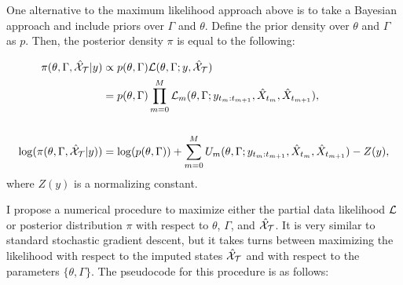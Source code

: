 One alternative to the maximum likelihood approach above is to take a Bayesian approach and include priors over $\Gamma$ and $\theta$. Define the prior density over $\theta$ and $\Gamma$ as $p$. Then, the posterior density $\pi$ is equal to the following:

\begin{align}
    \pi(\theta,\Gamma,\hat {\mathcal{X}}_{\mathcal{T}}|y) &\propto p( \theta, \Gamma) \mathcal{L}(\theta,\Gamma;y,\hat {\mathcal{X}}_{\mathcal{T}}) \nonumber \\
    &= p(\theta, \Gamma) \prod_{m=0}^{M} \mathcal{L}_m(\theta,\Gamma;y_{t_m:t_{m+1}},\hat X_{t_m},\hat X_{t_{m+1}}), 
    \label{eqn:bayes_no_label_like} \\ \nonumber \\
    \log(\pi(\theta,\Gamma,\hat {\mathcal{X}}_{\mathcal{T}}|y)) &= \log(p(\theta,\Gamma)) + \sum_{m=0}^{M} U_m(\theta,\Gamma;y_{t_m:t_{m+1}},\hat X_{t_m}, \hat X_{t_{m+1}}) - Z(y),
\end{align}
%
where $Z(y)$ is a normalizing constant. 

I propose a numerical procedure to maximize either the partial data likelihood $\mathcal{L}$ or posterior distribution $\pi$ with respect to $\theta$, $\Gamma$, and $\hat {\mathcal{X}}_{\mathcal{T}}$. It is very similar to standard stochastic gradient descent, but it takes turns between maximizing the likelihood with respect to the imputed states $\hat {\mathcal{X}}_{\mathcal{T}}$ and with respect to the parameters $\{\theta,\Gamma\}$. The pseudocode for this procedure is as follows:

